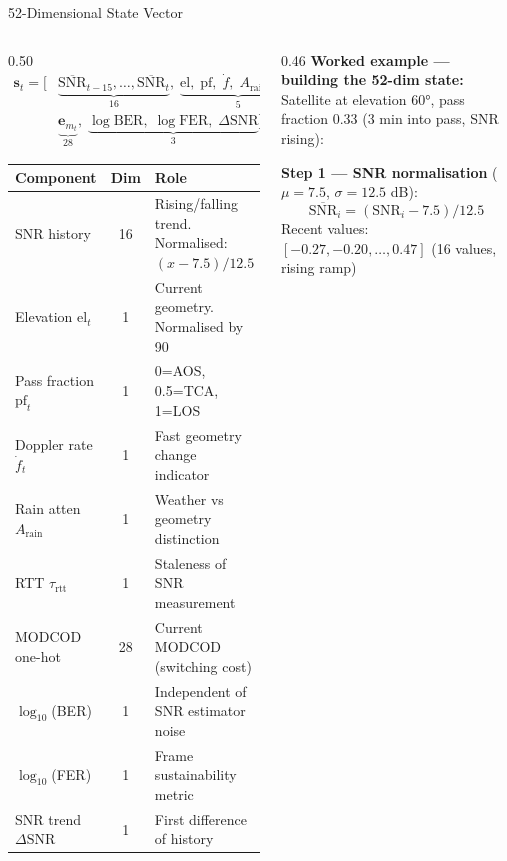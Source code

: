 \documentclass[aspectratio=169,10pt]{beamer}
\begin{document}
\begin{frame}[shrink=12]{52-Dimensional State Vector}
  \begin{columns}[T]
    \begin{column}{0.50\textwidth}
      \begin{align*}
        \mathbf{s}_t = \bigl[&\underbrace{\overline{\text{SNR}}_{t-15},\ldots,\overline{\text{SNR}}_t}_{16},\;
          \underbrace{\text{el},\;\text{pf},\;\dot{f},\;A_\text{rain},\;\tau_\text{rtt}}_{5},\\
          &\underbrace{\mathbf{e}_{m_t}}_{28},\;
          \underbrace{\log\text{BER},\;\log\text{FER},\;\Delta\text{SNR}}_{3}\bigr]
      \end{align*}
      {\scriptsize
      \begin{tabular}{p{3.0cm}cp{4.2cm}}
        \toprule
        \textbf{Component} & \textbf{Dim} & \textbf{Role}\\
        \midrule
        SNR history & 16 & Rising/falling trend. Normalised: $(x-7.5)/12.5$\\
        Elevation $\text{el}_t$ & 1 & Current geometry. Normalised by 90\\
        Pass fraction $\text{pf}_t$ & 1 & 0=AOS, 0.5=TCA, 1=LOS\\
        Doppler rate $\dot{f}_t$ & 1 & Fast geometry change indicator\\
        Rain atten $A_\text{rain}$ & 1 & Weather vs geometry distinction\\
        RTT $\tau_\text{rtt}$ & 1 & Staleness of SNR measurement\\
        MODCOD one-hot & 28 & Current MODCOD (switching cost)\\
        $\log_{10}$(BER) & 1 & Independent of SNR estimator noise\\
        $\log_{10}$(FER) & 1 & Frame sustainability metric\\
        SNR trend $\Delta\text{SNR}$ & 1 & First difference of history\\
        \bottomrule
      \end{tabular}}
    \end{column}
    \begin{column}{0.46\textwidth}
      \textbf{Worked example — building the 52-dim state:}\\
      \scriptsize Satellite at elevation 60°, pass fraction 0.33 (3 min into pass, SNR rising):
      \vspace{0.2em}

      \textbf{Step 1 — SNR normalisation} ($\mu=7.5$, $\sigma=12.5$ dB):
      \[\overline{\text{SNR}}_i = ({\text{SNR}_i - 7.5})/{12.5}\]
      Recent values: $[-0.27, -0.20, \ldots, 0.47]$ (16 values, rising ramp)


\end{column}
\end{columns}
\end{frame}
\end{document}
